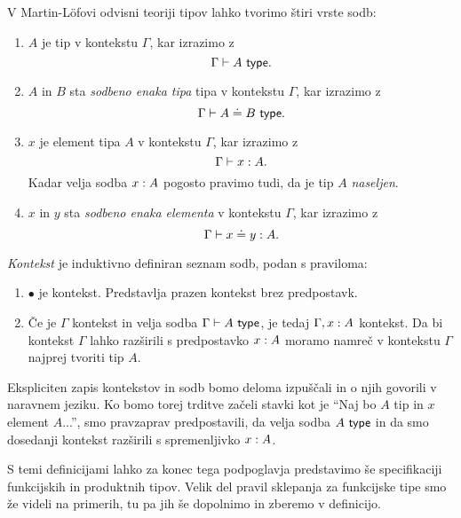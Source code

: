 \begin{definicija}
  V Martin-Löfovi odvisni teoriji tipov lahko tvorimo štiri vrste sodb:
\begin{enumerate}
\item \(A\) je tip v kontekstu \(\Gamma\), kar izrazimo z \[\Gamma \vdash A\ \textnormal{\textsf{type}}.\]
\item \(A\) in \(B\) sta \emph{sodbeno enaka tipa} tipa v kontekstu \(\Gamma\),
  kar izrazimo z \[\Gamma \vdash A \doteq B\ \textnormal{\textsf{type}}.\]
\item \(x\) je element tipa \(A\) v kontekstu \(\Gamma\), kar izrazimo z
  \[\Gamma \vdash {x : A}.\]
  Kadar velja sodba \({x : A}\) pogosto pravimo tudi, da je tip \(A\) \emph{naseljen}.
\item \(x\) in \(y\) sta \emph{sodbeno enaka elementa} v kontekstu \(\Gamma\), kar izrazimo z
  \[\Gamma \vdash {x \doteq y : A}.\]
\end{enumerate}
\emph{Kontekst} je induktivno definiran seznam sodb, podan s praviloma:
\begin{enumerate}
\item \(\bullet\) je kontekst. Predstavlja prazen kontekst brez predpostavk.
\item Če je \(\Gamma\) kontekst in velja sodba \(\Gamma \vdash A\ \textnormal{\textsf{type}}\), je tedaj \(\Gamma, {x : A}\) kontekst. Da bi kontekst \(\Gamma\) lahko razširili s predpostavko \({x : A}\) moramo namreč v kontekstu \(\Gamma\) najprej tvoriti tip \(A\).
\end{enumerate}
\end{definicija}
Ekspliciten zapis kontekstov in sodb bomo deloma izpuščali in o
njih govorili v naravnem jeziku. Ko bomo torej trditve začeli stavki kot je
``Naj bo \(A\) tip in \(x\) element \(A\)...'', smo pravzaprav predpostavili, da velja
sodba \(A\ \textnormal{\textsf{type}}\) in da smo dosedanji kontekst razširili s spremenljivko \({x : A}\).

S temi definicijami lahko za konec tega podpoglavja predstavimo še specifikaciji
funkcijskih in produktnih tipov. Velik del pravil sklepanja za funkcijske tipe smo že
videli na primerih, tu pa jih še dopolnimo in zberemo v definicijo.

